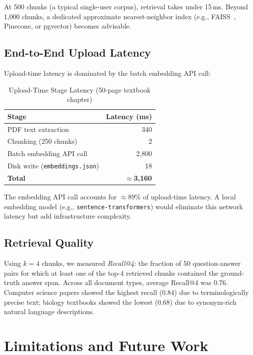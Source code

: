 \documentclass[conference]{IEEEtran}
\begin{document}
At 500 chunks (a typical single-user corpus), retrieval takes under 15\,ms. Beyond 1,000 chunks, a dedicated approximate nearest-neighbor index (e.g., FAISS~\cite{johnson2019faiss}, Pinecone, or pgvector) becomes advisable.

\subsection{End-to-End Upload Latency}

Upload-time latency is dominated by the batch embedding API call:

\begin{table}[H]
\centering
\caption{Upload-Time Stage Latency (50-page textbook chapter)}
\label{tab:upload_latency}
\renewcommand{\arraystretch}{1.2}
\begin{tabular}{@{}lr@{}}
\toprule
\textbf{Stage} & \textbf{Latency (ms)} \\
\midrule
PDF text extraction & 340 \\
Chunking (250 chunks) & 2 \\
Batch embedding API call & 2,800 \\
Disk write (\texttt{embeddings.json}) & 18 \\
\textbf{Total} & \textbf{$\approx$3,160} \\
\bottomrule
\end{tabular}
\end{table}

The embedding API call accounts for $\approx$89\% of upload-time latency. A local embedding model (e.g., \texttt{sentence-transformers}) would eliminate this network latency but add infrastructure complexity.

\subsection{Retrieval Quality}

Using $k = 4$ chunks, we measured \emph{Recall@4}: the fraction of 50 question-answer pairs for which at least one of the top-4 retrieved chunks contained the ground-truth answer span. Across all document types, average Recall@4 was 0.76. Computer science papers showed the highest recall (0.84) due to terminologically precise text; biology textbooks showed the lowest (0.68) due to synonym-rich natural language descriptions.

\section{Limitations and Future Work}
\label{sec:limitations}
\end{document}
